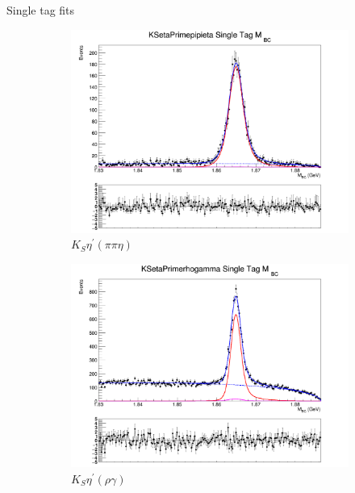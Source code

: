 \documentclass{beamer}
\begin{document}
\begin{frame}{Single tag fits}
\begin{figure}
\begin{subfigure}{0.33\textwidth}
      \includegraphics[width=1.0\textwidth]{Plots/KSetaPrimepipieta_SingleTag_MBC_Plot.png}
      \caption{$K_S\eta^\prime(\pi\pi\eta)$}
    \end{subfigure}%
    \begin{subfigure}{0.33\textwidth}
      \centering
      \includegraphics[width=1.0\textwidth]{Plots/KSetaPrimerhogamma_SingleTag_MBC_Plot.png}
      \caption{$K_S\eta^\prime(\rho\gamma)$}
    \end{subfigure}%
    \begin{subfigure}{0.33\textwidth}
      \centering

\end{subfigure}
\end{figure}
\end{frame}
\end{document}
